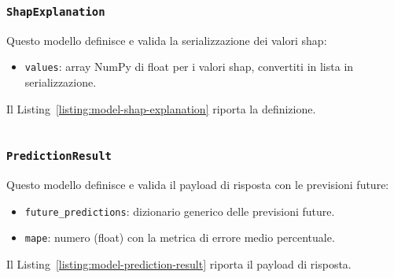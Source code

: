 \subsubsection{\texttt{ShapExplanation}}
Questo modello definisce e valida la serializzazione dei valori \acrshort{shap}:
\begin{itemize}
    \item \texttt{values}: array NumPy di float per i valori \acrshort{shap}, convertiti in lista in serializzazione.
\end{itemize}
Il Listing~\ref{listing:model-shap-explanation} riporta la definizione.
\begin{listing}[H]
\inputminted[fontsize=\small, breaklines, breakanywhere=true, linenos=true, bgcolor=gray!10]{python}{code/models/shap_explanation.py}
\caption{Modello Pydantic \texttt{ShapExplanation}.}
\label{listing:model-shap-explanation}
\end{listing}

\subsubsection{\texttt{PredictionResult}}
Questo modello definisce e valida il payload di risposta con le previsioni future:
\begin{itemize}
    \item \texttt{future\_predictions}: dizionario generico delle previsioni future.
    \item \texttt{\acrshort{mape}}: numero (float) con la metrica di errore medio percentuale.
\end{itemize}
Il Listing~\ref{listing:model-prediction-result} riporta il payload di risposta.
\begin{listing}[H]
\inputminted[fontsize=\small, breaklines, breakanywhere=true, linenos=true, bgcolor=gray!10]{python}{code/models/prediction_result.py}
\caption{Modello Pydantic \texttt{PredictionResult}.}
\label{listing:model-prediction-result}
\end{listing}

